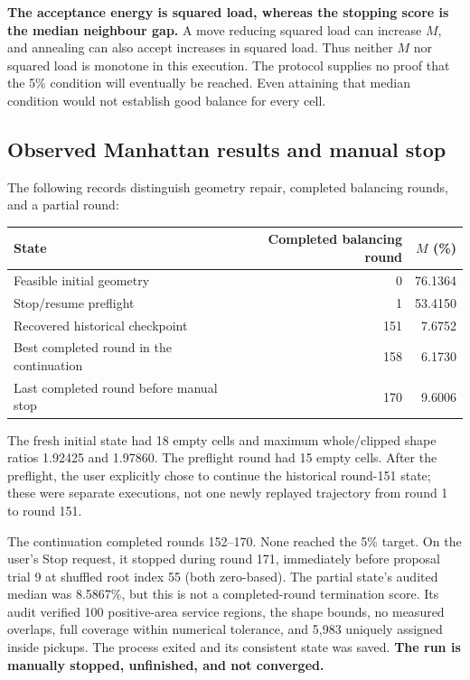 \documentclass[11pt]{article}
\begin{document}
\textbf{The acceptance energy is squared load, whereas the stopping score
is the median neighbour gap.} A move reducing squared load can increase
$M$, and annealing can also accept increases in squared load. Thus neither
$M$ nor squared load is monotone in this execution. The protocol supplies
no proof that the 5\% condition will eventually be reached. Even attaining
that median condition would not establish good balance for every cell.

\subsection{Observed Manhattan results and manual stop}
The following records distinguish geometry repair, completed balancing
rounds, and a partial round:
\begin{center}
\begin{tabular}{lrr}
\toprule
State & Completed balancing round & $M$ (\%)\\
\midrule
Feasible initial geometry & 0 & 76.1364\\
Stop/resume preflight & 1 & 53.4150\\
Recovered historical checkpoint & 151 & 7.6752\\
Best completed round in the continuation & 158 & 6.1730\\
Last completed round before manual stop & 170 & 9.6006\\
\bottomrule
\end{tabular}
\end{center}
The fresh initial state had 18 empty cells and maximum whole/clipped shape
ratios 1.92425 and 1.97860. The preflight round had 15 empty cells. After
the preflight, the user explicitly chose to continue the historical
round-151 state; these were separate executions, not one newly replayed
trajectory from round 1 to round 151.

The continuation completed rounds 152--170. None reached the 5\% target.
On the user's Stop request, it stopped during round 171, immediately before
proposal trial 9 at shuffled root index 55 (both zero-based). The partial
state's audited median was 8.5867\%, but this is not a completed-round
termination score. Its audit verified 100 positive-area service regions,
the shape bounds, no measured overlaps, full coverage within numerical
tolerance, and 5,983 uniquely assigned inside pickups. The process exited
and its consistent state was saved. \textbf{The run is manually stopped,
unfinished, and not converged.}
\end{document}

